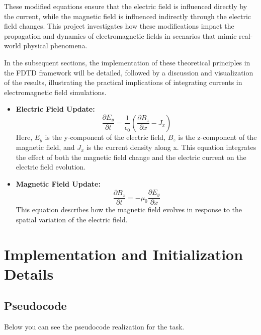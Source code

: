 \documentclass{article}[a4paper]
\begin{document}
These modified equations ensure that the electric field is influenced directly by the current, while the magnetic field is influenced indirectly through the electric field changes. This project investigates how these modifications impact the propagation and dynamics of electromagnetic fields in scenarios that mimic real-world physical phenomena.

In the subsequent sections, the implementation of these theoretical principles in the FDTD framework will be detailed, followed by a discussion and visualization of the results, illustrating the practical implications of integrating currents in electromagnetic field simulations.

\begin{itemize}
  \item \textbf{Electric Field Update:}
  \[
  \frac{\partial E_y}{\partial t} = \frac{1}{\epsilon_0} \left( \frac{\partial B_z}{\partial x} - J_x \right)
  \]
  Here, \(E_y\) is the y-component of the electric field, \(B_z\) is the z-component of the magnetic field, and \(J_x\) is the current density along x. This equation integrates the effect of both the magnetic field change and the electric current on the electric field evolution.

  \item \textbf{Magnetic Field Update:}
  \[
  \frac{\partial B_z}{\partial t} = -\mu_0 \frac{\partial E_y}{\partial x}
  \]
  This equation describes how the magnetic field evolves in response to the spatial variation of the electric field.
\end{itemize}

\section{Implementation and Initialization Details}

\subsection{Pseudocode}

Below you can see the pseudocode realization for the task.
\end{document}
